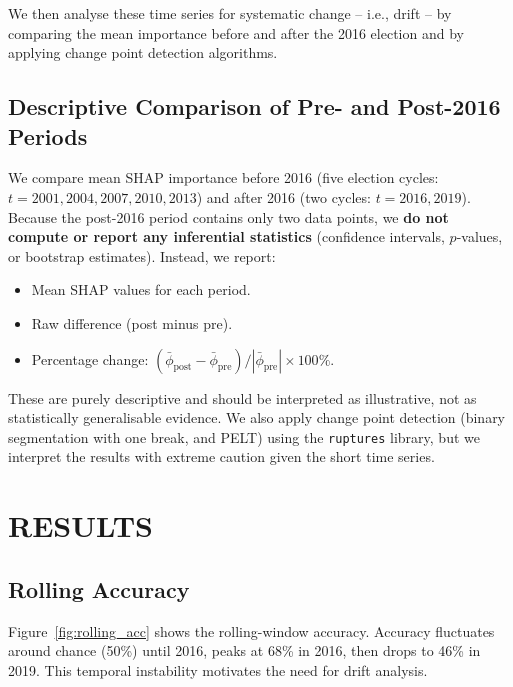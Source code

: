 \documentclass[conference]{IEEEtran}
\begin{document}
\begin{center}
\end{center}

We then analyse these time series for systematic change – i.e., drift – by comparing the mean importance before and after the 2016 election and by applying change point detection algorithms.

\subsection{Descriptive Comparison of Pre- and Post-2016 Periods}
We compare mean SHAP importance before 2016 (five election cycles: $t = 2001,2004,2007,2010,2013$) and after 2016 (two cycles: $t = 2016,2019$). Because the post-2016 period contains only two data points, we \textbf{do not compute or report any inferential statistics} (confidence intervals, $p$-values, or bootstrap estimates). Instead, we report:
\begin{itemize}
\item Mean SHAP values for each period.
\item Raw difference (post minus pre).
\item Percentage change: $(\bar{\phi}_{\text{post}} - \bar{\phi}_{\text{pre}})/|\bar{\phi}_{\text{pre}}| \times 100\%$.
\end{itemize}
These are purely descriptive and should be interpreted as illustrative, not as statistically generalisable evidence. We also apply change point detection (binary segmentation with one break, and PELT) using the \texttt{ruptures} library, but we interpret the results with extreme caution given the short time series.

\section{RESULTS}

\subsection{Rolling Accuracy}
Figure~\ref{fig:rolling_acc} shows the rolling-window accuracy. Accuracy fluctuates around chance (50\%) until 2016, peaks at 68\% in 2016, then drops to 46\% in 2019. This temporal instability motivates the need for drift analysis.
\end{document}
